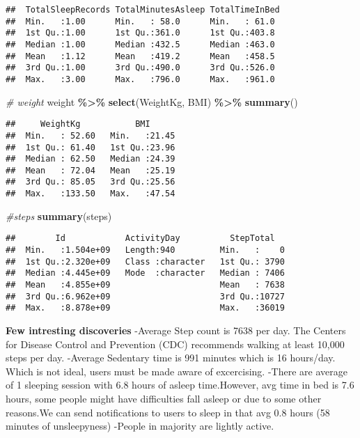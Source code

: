 \documentclass[
]{article}
\newenvironment{Shaded}{\begin{snugshade}}{\end{snugshade}}
\newcommand{\CommentTok}[1]{\textcolor[rgb]{0.56,0.35,0.01}{\textit{#1}}}
\newcommand{\FunctionTok}[1]{\textcolor[rgb]{0.13,0.29,0.53}{\textbf{#1}}}
\newcommand{\NormalTok}[1]{#1}
\newcommand{\SpecialCharTok}[1]{\textcolor[rgb]{0.81,0.36,0.00}{\textbf{#1}}}
\begin{document}
\begin{verbatim}
##  TotalSleepRecords TotalMinutesAsleep TotalTimeInBed 
##  Min.   :1.00      Min.   : 58.0      Min.   : 61.0  
##  1st Qu.:1.00      1st Qu.:361.0      1st Qu.:403.8  
##  Median :1.00      Median :432.5      Median :463.0  
##  Mean   :1.12      Mean   :419.2      Mean   :458.5  
##  3rd Qu.:1.00      3rd Qu.:490.0      3rd Qu.:526.0  
##  Max.   :3.00      Max.   :796.0      Max.   :961.0
\end{verbatim}

\begin{Shaded}
\begin{Highlighting}[]
\CommentTok{\# weight}
\NormalTok{weight }\SpecialCharTok{\%\textgreater{}\%}
  \FunctionTok{select}\NormalTok{(WeightKg, BMI) }\SpecialCharTok{\%\textgreater{}\%}
  \FunctionTok{summary}\NormalTok{()}
\end{Highlighting}
\end{Shaded}

\begin{verbatim}
##     WeightKg           BMI       
##  Min.   : 52.60   Min.   :21.45  
##  1st Qu.: 61.40   1st Qu.:23.96  
##  Median : 62.50   Median :24.39  
##  Mean   : 72.04   Mean   :25.19  
##  3rd Qu.: 85.05   3rd Qu.:25.56  
##  Max.   :133.50   Max.   :47.54
\end{verbatim}

\begin{Shaded}
\begin{Highlighting}[]
\CommentTok{\#steps}
  \FunctionTok{summary}\NormalTok{(steps)}
\end{Highlighting}
\end{Shaded}

\begin{verbatim}
##        Id            ActivityDay          StepTotal    
##  Min.   :1.504e+09   Length:940         Min.   :    0  
##  1st Qu.:2.320e+09   Class :character   1st Qu.: 3790  
##  Median :4.445e+09   Mode  :character   Median : 7406  
##  Mean   :4.855e+09                      Mean   : 7638  
##  3rd Qu.:6.962e+09                      3rd Qu.:10727  
##  Max.   :8.878e+09                      Max.   :36019
\end{verbatim}

\textbf{Few intresting discoveries} -Average Step count is 7638 per day.
The Centers for Disease Control and Prevention (CDC) recommends walking
at least 10,000 steps per day. -Average Sedentary time is 991 minutes
which is 16 hours/day. Which is not ideal, users must be made aware of
excercising. -There are average of 1 sleeping session with 6.8 hours of
asleep time.However, avg time in bed is 7.6 hours, some people might
have difficulties fall asleep or due to some other reasons.We can send
notifications to users to sleep in that avg 0.8 hours (58 minutes of
unsleepyness) -People in majority are lightly active.
\end{document}
